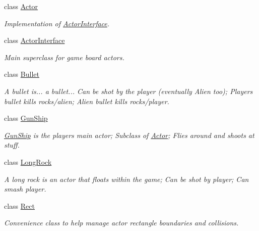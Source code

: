 \begin{DoxyCompactItemize}
\item 
class \hyperlink{classAsteroids_1_1Domain_1_1Game_1_1Actors_1_1Actor}{Actor}
\begin{DoxyCompactList}\small\item\em Implementation of \hyperlink{classAsteroids_1_1Domain_1_1Game_1_1Actors_1_1ActorInterface}{Actor\+Interface}. \end{DoxyCompactList}\item 
class \hyperlink{classAsteroids_1_1Domain_1_1Game_1_1Actors_1_1ActorInterface}{Actor\+Interface}
\begin{DoxyCompactList}\small\item\em Main superclass for game board actors. \end{DoxyCompactList}\item 
class \hyperlink{classAsteroids_1_1Domain_1_1Game_1_1Actors_1_1Bullet}{Bullet}
\begin{DoxyCompactList}\small\item\em A bullet is... a bullet... Can be shot by the player (eventually Alien too); Player\textquotesingle{}s bullet kills rocks/alien; Alien bullet kills rocks/player. \end{DoxyCompactList}\item 
class \hyperlink{classAsteroids_1_1Domain_1_1Game_1_1Actors_1_1GunShip}{Gun\+Ship}
\begin{DoxyCompactList}\small\item\em \hyperlink{classAsteroids_1_1Domain_1_1Game_1_1Actors_1_1GunShip}{Gun\+Ship} is the player\textquotesingle{}s main actor; Subclass of \hyperlink{classAsteroids_1_1Domain_1_1Game_1_1Actors_1_1Actor}{Actor}; Flies around and shoots at stuff. \end{DoxyCompactList}\item 
class \hyperlink{classAsteroids_1_1Domain_1_1Game_1_1Actors_1_1LongRock}{Long\+Rock}
\begin{DoxyCompactList}\small\item\em A long rock is an actor that floats within the game; Can be shot by player; Can smash player. \end{DoxyCompactList}\item 
class \hyperlink{classAsteroids_1_1Domain_1_1Game_1_1Actors_1_1Rect}{Rect}
\begin{DoxyCompactList}\small\item\em Convenience class to help manage actor rectangle boundaries and collisions. \end{DoxyCompactList}\item 

\end{DoxyCompactItemize}

